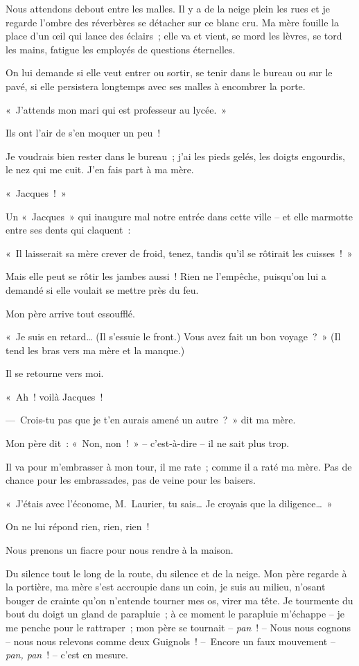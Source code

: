 \documentclass[french,twoside]{book} %
\begin{document}
Nous attendons debout entre les malles. Il y a de la neige plein les rues et je regarde l’ombre des réverbères se détacher sur ce blanc cru. Ma mère fouille la place d’un œil qui lance des éclairs ; elle va et vient, se mord les lèvres, se tord les mains, fatigue les employés de questions éternelles.\par
On lui demande si elle veut entrer ou sortir, se tenir dans le bureau ou sur le pavé, si elle persistera longtemps avec ses malles à encombrer la porte.\par
« J’attends mon mari qui est professeur au lycée. »\par
Ils ont l’air de s’en moquer un peu !\par
Je voudrais bien rester dans le bureau ; j’ai les pieds gelés, les doigts engourdis, le nez qui me cuit. J’en fais part à ma mère.\par
« Jacques ! »\par
Un « Jacques » qui inaugure mal notre entrée dans cette ville – et elle marmotte entre ses dents qui claquent :\par
« Il laisserait sa mère crever de froid, tenez, tandis qu’il se rôtirait les cuisses ! »\par
Mais elle peut se rôtir les jambes aussi ! Rien ne l’empêche, puisqu’on lui a demandé si elle voulait se mettre près du feu.\par
\bigbreak
\noindent Mon père arrive tout essoufflé.\par
« Je suis en retard… (Il s’essuie le front.) Vous avez fait un bon voyage ? » (Il tend les bras vers ma mère et la manque.)\par
Il se retourne vers moi.\par
« Ah ! voilà Jacques !\par
— Crois-tu pas que je t’en aurais amené un autre ? » dit ma mère.\par
Mon père dit : « Non, non ! » – c’est-à-dire – il ne sait plus trop.\par
Il va pour m’embrasser à mon tour, il me rate ; comme il a raté ma mère. Pas de chance pour les embrassades, pas de veine pour les baisers.\par
« J’étais avec l’économe, M. Laurier, tu sais… Je croyais que la diligence… »\par
On ne lui répond rien, rien, rien !\par
\bigbreak
\noindent Nous prenons un fiacre pour nous rendre à la maison.\par
Du silence tout le long de la route, du silence et de la neige. Mon père regarde à la portière, ma mère s’est accroupie dans un coin, je suis au milieu, n’osant bouger de crainte qu’on n’entende tourner mes os, virer ma tête. Je tourmente du bout du doigt un gland de parapluie ; à ce moment le parapluie m’échappe – je me penche pour le rattraper ; mon père se tournait – \emph{pan} ! – Nous nous cognons – nous nous relevons comme deux Guignols ! – Encore un faux mouvement – \emph{pan, pan} ! – c’est en mesure.\par
\end{document}
